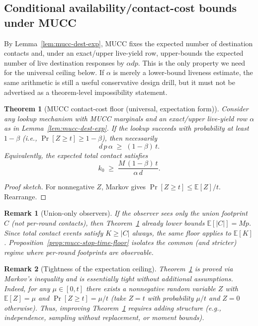 \documentclass[11pt]{article}
\newtheorem{theorem}{Theorem}
\newtheorem{remark}{Remark}
\newcommand{\E}{\mathbb{E}}
\begin{document}
\subsection{Conditional availability/contact-cost bounds under MUCC}
By Lemma~\ref{lem:mucc-dest-exp}, MUCC fixes the expected number of destination contacts and, under an exact/upper live-yield row, upper-bounds the expected number of live destination responses by $\alpha dp$.
This is the only property we need for the universal ceiling below.
If $\alpha$ is merely a lower-bound liveness estimate, the same arithmetic is still a useful conservative design drill, but it must not be advertised as a theorem-level impossibility statement.

\begin{theorem}[MUCC contact-cost floor (universal, expectation form)]
\label{thm:mucc-ceiling}
Consider any lookup mechanism with MUCC marginals and an exact/upper live-yield row $\alpha$ as in Lemma~\ref{lem:mucc-dest-exp}.
If the lookup succeeds with probability at least $1-\beta$ (i.e., $\Pr[Z\ge t]\ge 1-\beta$), then necessarily
\[
 d\,p\,\alpha \;\ge\; (1-\beta)\,t.
\]
Equivalently, the expected total contact satisfies
\[
 k_0 \;\ge\; \frac{M\,(1-\beta)\,t}{\alpha\,d}.
\]
\end{theorem}

\begin{proof}[Proof sketch]
For nonnegative $Z$, Markov gives $\Pr[Z\ge t]\le \E[Z]/t$.
Rearrange.
\end{proof}

\begin{remark}[Union-only observers]
If the observer sees only the union footprint $C$ (not per-round contacts), then Theorem~\ref{thm:mucc-ceiling} already lower bounds $\E[|C|]=Mp$.
Since total contact events satisfy $K\ge |C|$ always, the same floor applies to $\E[K]$.
Proposition~\ref{prop:mucc-stop-time-floor} isolates the common (and stricter) regime where per-round footprints are observable.
\end{remark}

\begin{remark}[Tightness of the expectation ceiling]
Theorem~\ref{thm:mucc-ceiling} is proved via Markov's inequality and is essentially tight without additional assumptions.
Indeed, for any $\mu\in[0,t]$ there exists a nonnegative random variable $Z$ with $\E[Z]=\mu$ and $\Pr[Z\ge t]=\mu/t$ (take $Z=t$ with probability $\mu/t$ and $Z=0$ otherwise).
Thus, improving Theorem~\ref{thm:mucc-ceiling} requires adding structure (e.g., independence, sampling without replacement, or moment bounds).
\end{remark}
\end{document}
